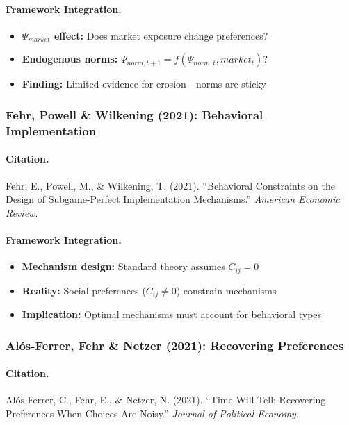 \documentclass[12pt,a4paper]{article}
\begin{document}
\paragraph{Framework Integration.}
\begin{itemize}
  \item \textbf{$\Psi_{market}$ effect:} Does market exposure change preferences?
  \item \textbf{Endogenous norms:} $\Psi_{norm,t+1} = f(\Psi_{norm,t}, market_t)$?
  \item \textbf{Finding:} Limited evidence for erosion---norms are sticky
\end{itemize}

\subsubsection{Fehr, Powell \& Wilkening (2021): Behavioral Implementation}

\paragraph{Citation.}
Fehr, E., Powell, M., \& Wilkening, T. (2021).
``Behavioral Constraints on the Design of Subgame-Perfect Implementation Mechanisms.''
\emph{American Economic Review}.

\paragraph{Framework Integration.}
\begin{itemize}
  \item \textbf{Mechanism design:} Standard theory assumes $C_{ij} = 0$
  \item \textbf{Reality:} Social preferences ($C_{ij} \neq 0$) constrain mechanisms
  \item \textbf{Implication:} Optimal mechanisms must account for behavioral types
\end{itemize}

\subsubsection{Al\'os-Ferrer, Fehr \& Netzer (2021): Recovering Preferences}

\paragraph{Citation.}
Al\'os-Ferrer, C., Fehr, E., \& Netzer, N. (2021).
``Time Will Tell: Recovering Preferences When Choices Are Noisy.''
\emph{Journal of Political Economy}.
\end{document}
